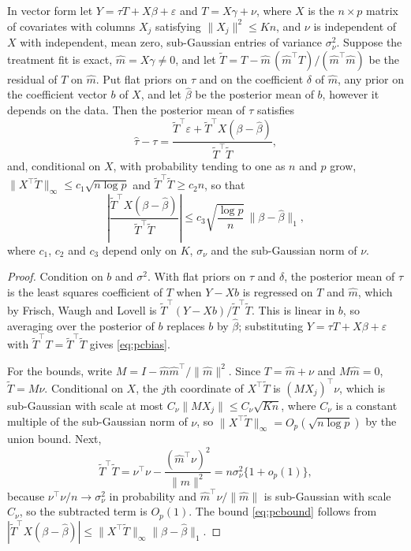 \begin{proposition}
In vector form let $Y = \tau T + X\beta + \varepsilon$ and $T = X\gamma + \nu$, where $X$ is the $n \times p$ matrix of covariates with columns $X_j$ satisfying $\|X_j\|^2 \le Kn$, and $\nu$ is independent of $X$ with independent, mean zero, sub-Gaussian entries of variance $\sigma_\nu^2$. Suppose the treatment fit is exact, $\hat m = X\gamma \ne 0$, and let $\tilde T = T - \hat m\,(\hat m^\top T)/(\hat m^\top\hat m)$ be the residual of $T$ on $\hat m$. Put flat priors on $\tau$ and on the coefficient $\delta$ of $\hat m$, any prior on the coefficient vector $b$ of $X$, and let $\hat\beta$ be the posterior mean of $b$, however it depends on the data. Then the posterior mean of $\tau$ satisfies
\begin{equation}
\hat\tau - \tau = \frac{\tilde T^\top\varepsilon + \tilde T^\top X(\beta - \hat\beta)}{\tilde T^\top\tilde T},
\label{eq:pcbias}
\end{equation}
and, conditional on $X$, with probability tending to one as $n$ and $p$ grow, $\|X^\top\tilde T\|_\infty \le c_1\sqrt{n\log p}$ and $\tilde T^\top\tilde T \ge c_2n$, so that
\begin{equation}
\left|\frac{\tilde T^\top X(\beta - \hat\beta)}{\tilde T^\top\tilde T}\right| \le c_3\sqrt{\frac{\log p}{n}}\,\|\beta - \hat\beta\|_1,
\label{eq:pcbound}
\end{equation}
where $c_1$, $c_2$ and $c_3$ depend only on $K$, $\sigma_\nu$ and the sub-Gaussian norm of $\nu$.
\end{proposition}

\begin{proof}
Condition on $b$ and $\sigma^2$. With flat priors on $\tau$ and $\delta$, the posterior mean of $\tau$ is the least squares coefficient of $T$ when $Y - Xb$ is regressed on $T$ and $\hat m$, which by Frisch, Waugh and Lovell is $\tilde T^\top(Y - Xb)/\tilde T^\top\tilde T$. This is linear in $b$, so averaging over the posterior of $b$ replaces $b$ by $\hat\beta$; substituting $Y = \tau T + X\beta + \varepsilon$ with $\tilde T^\top T = \tilde T^\top\tilde T$ gives \eqref{eq:pcbias}.

For the bounds, write $M = I - \hat m\hat m^\top/\|\hat m\|^2$. Since $T = \hat m + \nu$ and $M\hat m = 0$, $\tilde T = M\nu$. Conditional on $X$, the $j$th coordinate of $X^\top\tilde T$ is $(MX_j)^\top\nu$, which is sub-Gaussian with scale at most $C_\nu\|MX_j\| \le C_\nu\sqrt{Kn}$, where $C_\nu$ is a constant multiple of the sub-Gaussian norm of $\nu$, so $\|X^\top\tilde T\|_\infty = O_p(\sqrt{n\log p})$ by the union bound. Next,
\[
\tilde T^\top\tilde T = \nu^\top\nu - \frac{(\hat m^\top\nu)^2}{\|\hat m\|^2} = n\sigma_\nu^2\{1 + o_p(1)\},
\]
because $\nu^\top\nu/n \to \sigma_\nu^2$ in probability and $\hat m^\top\nu/\|\hat m\|$ is sub-Gaussian with scale $C_\nu$, so the subtracted term is $O_p(1)$. The bound \eqref{eq:pcbound} follows from $|\tilde T^\top X(\beta - \hat\beta)| \le \|X^\top\tilde T\|_\infty\|\beta - \hat\beta\|_1$.
\end{proof}


